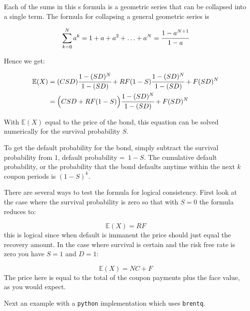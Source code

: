 Each of the sums in this s formula is a geometric series that can be collapsed
into a single term. The formula for collapsing a general geometric series is 

\[ \sum_{k=0}^N a^k = 1 + a + a^2 + \ldots + a^N = \cfrac{1-a^{N+1}}{1-a} \]

Hence we get:

\begin{align*}
\mathbb{E}(X) &= (CSD) \cfrac{1-(SD)^N}{1-(SD)}+RF(1-S)\cfrac{1-(SD)^N}{1-(SD)} + F(SD)^N \\
&= \Big(CSD + RF(1-S)\Big)\cfrac{1-(SD)^N}{1-(SD)} + F(SD)^N 
\end{align*}

With $\mathbb{E}(X)$ equal to the price of the bond, this equation can be solved numerically for the survival probability $S$.

To get the default probability for the bond, simply subtract the survival
probability from 1, default probability =~$1 - S$. The cumulative default
probability, or the probability that the bond defaults anytime within the
next $k$ coupon periods is $(1 - S)^k$.

There are several ways to test the formula for logical consistency. First look
at the case where the survival probability is zero so that with $S = 0$ the
formula reduces to:

\[\mathbb{E}(X) = RF\]
this is logical since when default is immanent the price should just equal the
recovery amount.
In the case where survival is certain and the risk free rate is zero you have
$S = 1$ and $D=1$:

\[\mathbb{E}(X) = NC + F \]
The price here is equal to the total of the coupon payments plus the face
value, as you would expect.

Next an example with a \texttt{python} implementation which uses \texttt{brentq}.



